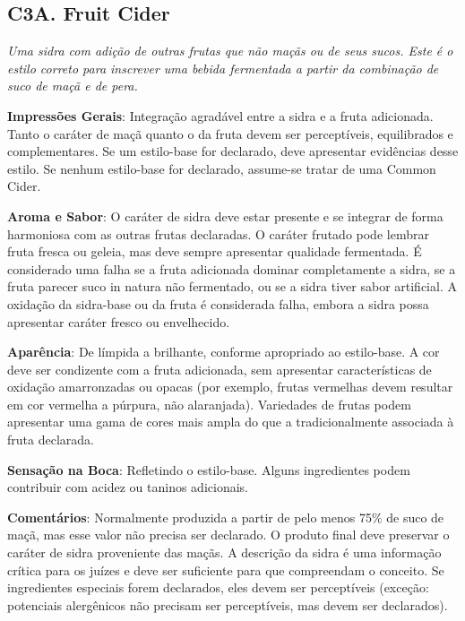 \subsection*{C3A. Fruit Cider}

\textit{Uma sidra com adição de outras frutas que não maçãs ou de seus sucos. Este é o estilo correto para inscrever uma bebida fermentada a partir da combinação de suco de maçã e de pera.}

\textbf{Impressões Gerais}: Integração agradável entre a sidra e a fruta adicionada. Tanto o caráter de maçã quanto o da fruta devem ser perceptíveis, equilibrados e complementares. Se um estilo-base for declarado, deve apresentar evidências desse estilo. Se nenhum estilo-base for declarado, assume-se tratar de uma Common Cider.

\textbf{Aroma e Sabor}: O caráter de sidra deve estar presente e se integrar de forma harmoniosa com as outras frutas declaradas. O caráter frutado pode lembrar fruta fresca ou geleia, mas deve sempre apresentar qualidade fermentada. É considerado uma falha se a fruta adicionada dominar completamente a sidra, se a fruta parecer suco in natura não fermentado, ou se a sidra tiver sabor artificial. A oxidação da sidra-base ou da fruta é considerada falha, embora a sidra possa apresentar caráter fresco ou envelhecido.

\textbf{Aparência}: De límpida a brilhante, conforme apropriado ao estilo-base. A cor deve ser condizente com a fruta adicionada, sem apresentar características de oxidação amarronzadas ou opacas (por exemplo, frutas vermelhas devem resultar em cor vermelha a púrpura, não alaranjada). Variedades de frutas podem apresentar uma gama de cores mais ampla do que a tradicionalmente associada à fruta declarada.

\textbf{Sensação na Boca}: Refletindo o estilo-base. Alguns ingredientes podem contribuir com acidez ou taninos adicionais.

\textbf{Comentários}: Normalmente produzida a partir de pelo menos 75\% de suco de maçã, mas esse valor não precisa ser declarado. O produto final deve preservar o caráter de sidra proveniente das maçãs. A descrição da sidra é uma informação crítica para os juízes e deve ser suficiente para que compreendam o conceito. Se ingredientes especiais forem declarados, eles devem ser perceptíveis (exceção: potenciais alergênicos não precisam ser perceptíveis, mas devem ser declarados).


